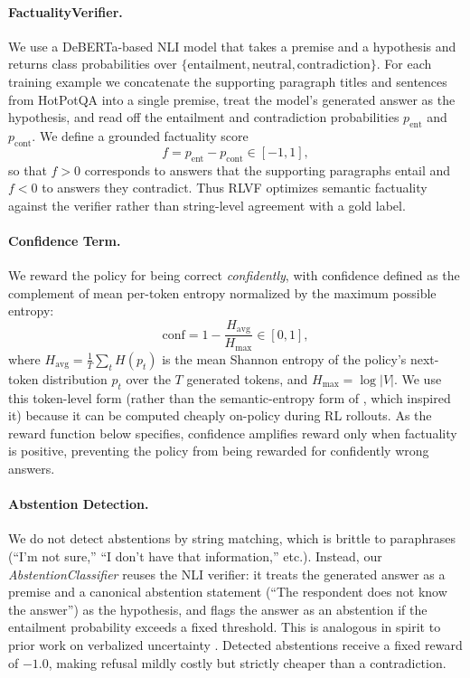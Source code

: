 \documentclass[11pt]{article}
\begin{document}
\paragraph{FactualityVerifier.} We use a DeBERTa-based NLI model \cite{he2021deberta,he2021debertav3} that takes a premise and a hypothesis and returns class probabilities over $\{\text{entailment}, \text{neutral}, \text{contradiction}\}$. For each training example we concatenate the supporting paragraph titles and sentences from HotPotQA \cite{yang2018hotpotqadatasetdiverseexplainable} into a single premise, treat the model's generated answer as the hypothesis, and read off the entailment and contradiction probabilities $p_{\text{ent}}$ and $p_{\text{cont}}$. We define a grounded factuality score
\[
f = p_{\text{ent}} - p_{\text{cont}} \in [-1, 1],
\]
so that $f > 0$ corresponds to answers that the supporting paragraphs entail and $f < 0$ to answers they contradict. Thus RLVF optimizes semantic factuality against the verifier rather than string-level agreement with a gold label.

\paragraph{Confidence Term.}
We reward the policy for being correct \emph{confidently}, with confidence defined as the complement of mean per-token entropy normalized by the maximum possible entropy:
\[
\text{conf} = 1 - \frac{H_{\text{avg}}}{H_{\max}} \in [0, 1],
\]
where $H_{\text{avg}} = \frac{1}{T}\sum_{t} H(p_t)$ is the mean Shannon entropy of the policy's next-token distribution $p_t$ over the $T$ generated tokens, and $H_{\max} = \log|V|$. We use this token-level form (rather than the semantic-entropy form of \citet{Farquhar2024Detecting}, which inspired it) because it can be computed cheaply on-policy during RL rollouts. As the reward function below specifies, confidence amplifies reward only when factuality is positive, preventing the policy from being rewarded for confidently wrong answers.

\paragraph{Abstention Detection.}
We do not detect abstentions by string matching, which is brittle to paraphrases (``I'm not sure,'' ``I don't have that information,'' etc.). Instead, our \emph{AbstentionClassifier} reuses the NLI verifier: it treats the generated answer as a premise and a canonical abstention statement (``The respondent does not know the answer'') as the hypothesis, and flags the answer as an abstention if the entailment probability exceeds a fixed threshold. This is analogous in spirit to prior work on verbalized uncertainty \cite{lin2022teaching}. Detected abstentions receive a fixed reward of $-1.0$, making refusal mildly costly but strictly cheaper than a contradiction.
\end{document}
